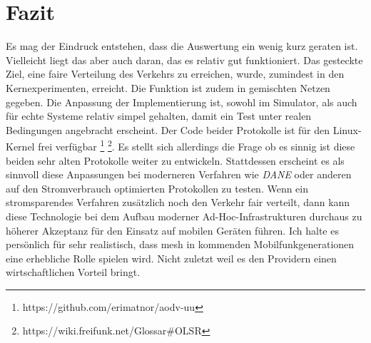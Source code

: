 
\chapter{Fazit}
\label{chapter:fazit}

Es mag der Eindruck entstehen, dass die Auswertung ein wenig kurz geraten ist. Vielleicht liegt das aber auch daran, das es relativ gut funktioniert. Das gesteckte Ziel, eine faire Verteilung des Verkehrs zu erreichen, wurde, zumindest in den Kernexperimenten, erreicht. Die Funktion ist zudem in gemischten Netzen gegeben. Die Anpassung der Implementierung ist, sowohl im Simulator, als auch für echte Systeme relativ simpel gehalten, damit ein Test unter realen Bedingungen angebracht erscheint. Der Code beider Protokolle ist für den Linux-Kernel frei verfügbar \footnote{https://github.com/erimatnor/aodv-uu} \footnote{https://wiki.freifunk.net/Glossar\#OLSR}. Es stellt sich allerdings die Frage ob es sinnig ist diese beiden sehr alten Protokolle weiter zu entwickeln. Stattdessen erscheint es als sinnvoll diese Anpassungen bei moderneren Verfahren wie \textit{DANE} oder anderen auf den Stromverbrauch optimierten Protokollen zu testen. Wenn ein stromsparendes Verfahren zusätzlich noch den Verkehr fair verteilt, dann kann diese Technologie bei dem Aufbau moderner Ad-Hoc-Infrastrukturen durchaus zu höherer Akzeptanz für den Einsatz auf mobilen Geräten führen. Ich halte es persönlich für sehr realistisch, dass \gls{mesh} in kommenden Mobilfunkgenerationen eine erhebliche Rolle spielen wird. Nicht zuletzt weil es den Providern einen wirtschaftlichen Vorteil bringt.